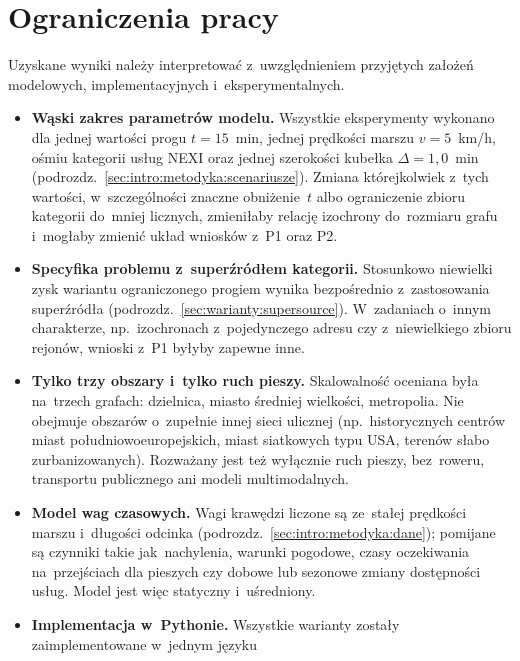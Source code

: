 \section{Ograniczenia pracy}
\label{sec:podsum:ograniczenia}

Uzyskane wyniki należy interpretować z~uwzględnieniem przyjętych
założeń modelowych, implementacyjnych i~eksperymentalnych.

\begin{itemize}
  \item \textbf{Wąski zakres parametrów modelu.}
        Wszystkie eksperymenty wykonano dla jednej wartości progu
        $t=15$~min, jednej prędkości marszu $v=5$~km/h, ośmiu kategorii
        usług NEXI oraz jednej szerokości kubełka $\Delta=1{,}0$~min
        (podrozdz.~\ref{sec:intro:metodyka:scenariusze}). Zmiana którejkolwiek
        z~tych wartości, w~szczególności znaczne obniżenie~$t$ albo
        ograniczenie zbioru kategorii do~mniej licznych, zmieniłaby
        relację izochrony do~rozmiaru grafu i~mogłaby zmienić układ
        wniosków z~P1 oraz P2.
  \item \textbf{Specyfika problemu z~superźródłem kategorii.}
        Stosunkowo niewielki zysk wariantu ograniczonego progiem
        wynika bezpośrednio z~zastosowania superźródła
        (podrozdz.~\ref{sec:warianty:supersource}). W~zadaniach
        o~innym charakterze, np.\ izochronach z~pojedynczego adresu
        czy z~niewielkiego zbioru rejonów, wnioski z~P1
        byłyby zapewne inne.
  \item \textbf{Tylko trzy obszary i~tylko ruch pieszy.}
        Skalowalność oceniana była na~trzech grafach: dzielnica, miasto
        średniej wielkości, metropolia. Nie obejmuje obszarów o~zupełnie
        innej sieci ulicznej (np.\ historycznych centrów
        miast południowoeuropejskich, miast siatkowych typu USA, terenów
        słabo zurbanizowanych). Rozważany jest też wyłącznie ruch
        pieszy, bez~roweru, transportu publicznego ani modeli
        multimodalnych.
  \item \textbf{Model wag czasowych.}
        Wagi krawędzi liczone są ze~stałej prędkości marszu i~długości
        odcinka (podrozdz.~\ref{sec:intro:metodyka:dane}); pomijane są
        czynniki takie jak~nachylenia, warunki pogodowe, czasy oczekiwania
        na~przejściach dla pieszych czy dobowe lub sezonowe zmiany
        dostępności usług. Model jest więc statyczny i~uśredniony.
  \item \textbf{Implementacja w~Pythonie.}
        Wszystkie warianty zostały zaimplementowane w~jednym języku

\end{itemize}
